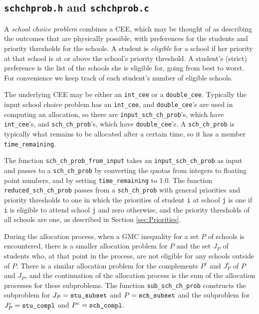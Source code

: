 \documentclass[12pt]{article}
\theoremstyle{definition}
\begin{document}
\begin{appendix}
\subsection{\texttt{schchprob.h} and \texttt{schchprob.c}}

A \emph{school choice problem} combines a CEE, which may be thought of
as describing the outcomes that are physically possible, with
preferences for the students and priority thresholds for the schools.
A student is \emph{eligible} for a school if her priority at that
school is at or above the school's priority threshold. A student's
(strict) preference is the list of the schools she is eligible for,
going from best to worst.  For convenience we keep track of each
student's number of eligible schools.

The underlying CEE may be either an \texttt{int\_cee} or a
\texttt{double\_cee}.  Typically the input school choice problem has
an \texttt{int\_cee}, and \texttt{double\_cee}'s are used in computing
an allocation, so there are \texttt{input\_sch\_ch\_prob}'s, which
have \texttt{int\_cee}'s, and \texttt{sch\_ch\_prob}'s, which have
\texttt{double\_cee}'s.  A \texttt{sch\_ch\_prob} is typically what
remains to be allocated after a certain time, so it has a member
\texttt{time\_remaining}.

The function \texttt{sch\_ch\_prob\_from\_input} takes an
\texttt{input\_sch\_ch\_prob} as input and passes to a
\texttt{sch\_ch\_prob} by converting the quotas from integers to
floating point numbers, and by setting \texttt{time\_remaining} to
1.0.  The function \texttt{reduced\_sch\_ch\_prob} passes from a
\texttt{sch\_ch\_prob} with general priorities and priority thresholds
to one in which the priorities of student \texttt{i} at school
\texttt{j} is one if \texttt{i} is eligible to attend school
\texttt{j} and zero otherwise, and the priority thresholds of all
schools are one, as described in Section \ref{sec:Priorities}.

During the allocation process, when a GMC inequality for a set $P$ of
schools is encountered, there is a smaller allocation problem for $P$
and the set $J_P$ of students who, at that point in the process, are
not eligible for any schools outside of $P$.  There is a similar
allocation problem for the complements $P^c$ and $J_P^c$ of $P$ and
$J_P$, and the continuation of the allocation process is the sum of
the allocation processes for these subproblems.  The function
\texttt{sub\_sch\_ch\_prob} constructs the subproblem for $J_P =
\text{\texttt{stu\_subset}}$ and $P = \text{\texttt{sch\_subset}}$ and
the subproblem for $J_P^c = \text{\texttt{stu\_compl}}$ and $P^c =
\text{\texttt{sch\_compl}}$.  


\end{appendix}
\end{document}
